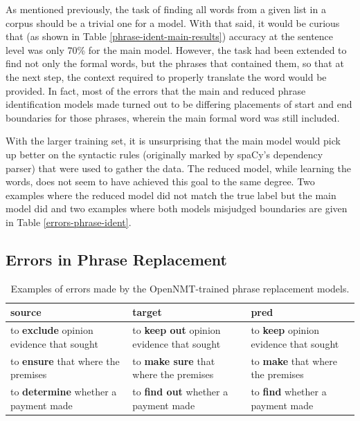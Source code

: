As mentioned previously, the task of finding all words from a given list in a corpus should be a trivial one for a model. With that said, it would be curious that (as shown in Table \ref{phrase-ident-main-results}) accuracy at the sentence level was only 70\% for the main model. However, the task had been extended to find not only the formal words, but the phrases that contained them, so that at the next step, the context required to properly translate the word would be provided. In fact, most of the errors that the main and reduced phrase identification models made turned out to be differing placements of start and end boundaries for those phrases, wherein the main formal word was still included.

With the larger training set, it is unsurprising that the main model would pick up better on the syntactic rules (originally marked by spaCy's dependency parser) that were used to gather the data. The reduced model, while learning the words, does not seem to have achieved this goal to the same degree. Two examples where the reduced model did not match the true label but the main model did and two examples where both models misjudged boundaries are given in Table \ref{errors-phrase-ident}.

\subsection{Errors in Phrase Replacement}

\begin{table}[h]
\centering
 \begin{tabular}{|| p{4cm} | p{4cm} | p{4cm} ||}
 \hline
 source & target & pred \\ [0.3ex] 
 \hline\hline
 to \textbf{exclude} opinion evidence that sought & 
 to \textbf{keep out} opinion evidence that sought & 
 to \textbf{keep} opinion evidence that sought \\
 \hline
 to \textbf{ensure} that where the premises & 
 to \textbf{make sure} that where the premises & 
 to \textbf{make} that where the premises \\
 \hline
 to \textbf{determine} whether a payment made & 
 to \textbf{find out} whether a payment made & 
 to \textbf{find} whether a payment made \\
 \hline
\end{tabular}
\caption{Examples of errors made by the OpenNMT-trained phrase replacement models.}
\label{errors-phrase-repl}
\end{table}

